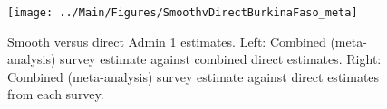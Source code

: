 \documentclass[12pt]{article}\usepackage[]{graphicx}\usepackage[]{color}
\newenvironment{knitrout}{}{} %
\begin{document}



\begin{knitrout}
\color{fgcolor}\begin{figure}[bht]

{\centering \texttt{[image: ../Main/Figures/SmoothvDirectBurkinaFaso\_meta]} 

}

\caption[Smooth versus direct Admin 1 estimates]{Smooth versus direct Admin 1 estimates. Left: Combined (meta-analysis) survey estimate against combined direct estimates. Right: Combined (meta-analysis) survey estimate against direct estimates from each survey.}\label{fig:unnamed-chunk-23}
\end{figure}


\end{knitrout}
\end{document}

